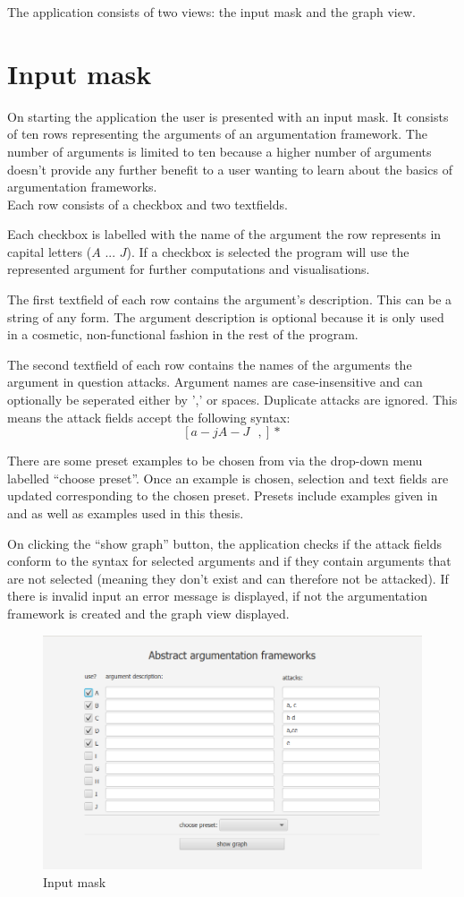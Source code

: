 \documentclass[draft,final]{vutinfth} %
\newcommand{\hl}{\par\vspace{6pt}} %
\begin{document}
The application consists of two views: the input mask and the graph view.

\section{Input mask}
On starting the application the user is presented with an input mask. It consists of ten rows representing the arguments of an argumentation framework. The number of arguments is limited to ten because a higher number of arguments doesn't provide any further benefit to a user wanting to learn about the basics of argumentation frameworks.\\
Each row consists of a checkbox and two textfields.\hl
Each checkbox is labelled with the name of the argument the row represents in capital letters ($A$ ... $J$). If a checkbox is selected the program will use the represented argument for further computations and visualisations.\hl
The first textfield of each row contains the argument's description. This can be a string of any form. The argument description is optional because it is only used in a cosmetic, non-functional fashion in the rest of the program.\hl
The second textfield of each row contains the names of the arguments the argument in question attacks. Argument names are case-insensitive and can optionally be seperated either by ',' or spaces. Duplicate attacks are ignored. This means the attack fields accept the following syntax: \[[a-jA-J\text{ },]*\]\hl %

There are some preset examples to be chosen from via the drop-down menu labelled ``choose preset''. Once an example is chosen, selection and text fields are updated corresponding to the chosen preset. Presets include examples given in \cite{Dung} and \cite{Egly} as well as examples used in this thesis.\hl
On clicking the ``show graph'' button, the application checks if the attack fields conform to the syntax for selected arguments and if they contain arguments that are not selected (meaning they don't exist and can therefore not be attacked). If there is invalid input an error message is displayed, if not the argumentation framework is created and the graph view displayed.\hl

\FloatBarrier
	\begin{figure}[!ht]
		\centering
		\includegraphics[width=\linewidth]{pics/chaotic.png}
		\caption{Input mask}
	\end{figure}
\FloatBarrier
\end{document}
